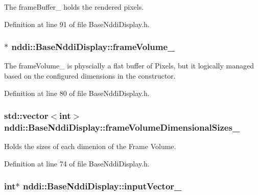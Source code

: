 The frameBuffer\_\- holds the rendered pixels. 



Definition at line 91 of file BaseNddiDisplay.h.

\hypertarget{classnddi_1_1_base_nddi_display_aa5bb1202a2b39b4c7c0f6647e3a01a82}{
\subsubsection[{frameVolume\_\-}]{$\ast$ {\bf nddi::BaseNddiDisplay::frameVolume\_\-}}}
\label{classnddi_1_1_base_nddi_display_aa5bb1202a2b39b4c7c0f6647e3a01a82}


The frameVolume\_\- is physcially a flat buffer of Pixels, but it logically managed based on the configured dimensions in the constructor. 



Definition at line 80 of file BaseNddiDisplay.h.

\hypertarget{classnddi_1_1_base_nddi_display_a1a20c4ed32c3a9e218d8183204bc2afe}{
\subsubsection[{frameVolumeDimensionalSizes\_\-}]{\setlength{\rightskip}{0pt plus 5cm}std::vector$<$int$>$ {\bf nddi::BaseNddiDisplay::frameVolumeDimensionalSizes\_\-}}}
\label{classnddi_1_1_base_nddi_display_a1a20c4ed32c3a9e218d8183204bc2afe}


Holds the sizes of each dimenion of the Frame Volume. 



Definition at line 74 of file BaseNddiDisplay.h.

\hypertarget{classnddi_1_1_base_nddi_display_aca1b4dd9f1a11e85e96bb0eb1f143dc8}{
\subsubsection[{inputVector\_\-}]{\setlength{\rightskip}{0pt plus 5cm}int$\ast$ {\bf nddi::BaseNddiDisplay::inputVector\_\-}}}
\label{classnddi_1_1_base_nddi_display_aca1b4dd9f1a11e85e96bb0eb1f143dc8}


